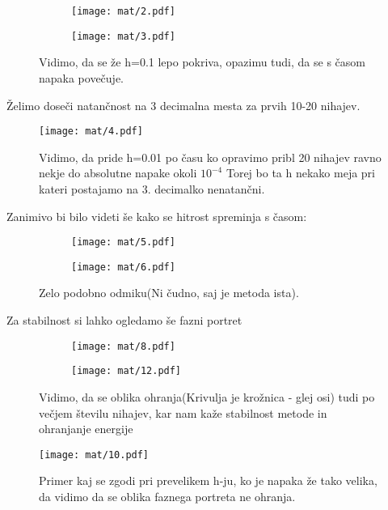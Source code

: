 \documentclass{article}
\begin{document}
\begin{figure}[H]
\begin{subfigure}{.5\textwidth}
\texttt{[image: mat/2.pdf]}
\end{subfigure}
\begin{subfigure}{.5\textwidth}
\texttt{[image: mat/3.pdf]}
\end{subfigure}
\caption*{Vidimo, da se že h=0.1 lepo pokriva, opazimu tudi, da se s časom napaka povečuje. }
\end{figure}

Želimo doseči natančnost na 3 decimalna mesta za prvih 10-20 nihajev.

\begin{figure}[H]
\texttt{[image: mat/4.pdf]}
\caption*{Vidimo, da pride h=0.01 po času ko opravimo pribl 20 nihajev ravno nekje do absolutne napake okoli $10^{-4}$ Torej bo ta h nekako meja pri kateri postajamo na 3. decimalko nenatančni.}  
\end{figure}

Zanimivo bi bilo videti še kako se hitrost spreminja s časom:

\begin{figure}[H]
\begin{subfigure}{.5\textwidth}
\texttt{[image: mat/5.pdf]}
\end{subfigure}
\begin{subfigure}{.5\textwidth}
\texttt{[image: mat/6.pdf]}
\end{subfigure}
\caption*{Zelo podobno odmiku(Ni čudno, saj je metoda ista).}
\end{figure}

Za stabilnost si lahko ogledamo še fazni portret

\begin{figure}[H]
\begin{subfigure}{.5\textwidth}
\texttt{[image: mat/8.pdf]}
\end{subfigure}
\begin{subfigure}{.5\textwidth}
\texttt{[image: mat/12.pdf]}
\end{subfigure}
\caption*{Vidimo, da se oblika ohranja(Krivulja je krožnica - glej osi) tudi po večjem številu nihajev, kar nam kaže stabilnost metode in ohranjanje energije}
\end{figure}

\begin{figure}[H]
\texttt{[image: mat/10.pdf]}
\caption*{Primer kaj se zgodi pri prevelikem h-ju, ko je napaka že tako velika, da vidimo da se oblika faznega portreta ne ohranja.}  
\end{figure}
\end{document}

